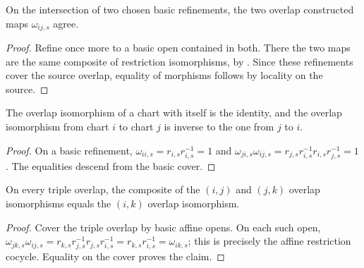 \begin{lemma}
  \label{lemma:nagata-global-blowup-overlap-independent}

  On the intersection of two chosen basic refinements, the two overlap
  constructed maps $\omega_{ij,s}$ agree.
\end{lemma}

\begin{proof}
  Refine once more to a basic open contained in both.  There the two maps are
  the same composite of restriction isomorphisms, by
  .  Since these refinements
  cover the source overlap, equality of morphisms follows by locality on the
  source.
\end{proof}

\begin{lemma}
  \label{lemma:nagata-global-blowup-overlap-id-symm}

  The overlap isomorphism of a chart with itself is the identity, and the
  overlap isomorphism from chart $i$ to chart $j$ is inverse to the one from
  $j$ to $i$.
\end{lemma}

\begin{proof}
  On a basic refinement, $\omega_{ii,s}=r_{i,s}r_{i,s}^{-1}=1$ and
  $\omega_{ji,s}\omega_{ij,s}=r_{j,s}r_{i,s}^{-1}r_{i,s}r_{j,s}^{-1}=1$.
  The equalities descend from the basic cover.
\end{proof}

\begin{lemma}
  \label{lemma:nagata-global-blowup-overlap-cocycle}

  On every triple overlap, the composite of the $(i,j)$ and $(j,k)$ overlap
  isomorphisms equals the $(i,k)$ overlap isomorphism.
\end{lemma}

\begin{proof}
  Cover the triple overlap by basic affine opens.  On each such open,
  $\omega_{jk,s}\omega_{ij,s}=r_{k,s}r_{j,s}^{-1}r_{j,s}r_{i,s}^{-1}
  =r_{k,s}r_{i,s}^{-1}=\omega_{ik,s}$; this is precisely the affine
  restriction cocycle.  Equality on the cover proves the claim.
\end{proof}


